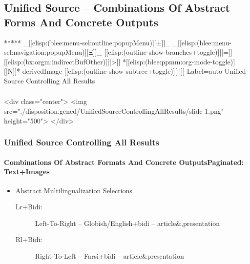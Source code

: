 \begin{whenOrg}
\section{Unified Source -- Combinations Of Abstract Forms And Concrete Outputs}

\begin{whenOrg}
*****  _[[elisp:(blee:menu-sel:outline:popupMenu)][±]]_ _[[elisp:(blee:menu-sel:navigation:popupMenu)][Ξ]]_ [[elisp:(outline-show-branches+toggle)][|=]] [[elisp:(bx:orgm:indirectBufOther)][|>]] *[[elisp:(blee:ppmm:org-mode-toggle)][|N]]*  derivedImage [[elisp:(outline-show-subtree+toggle)][||]] Label=auto Unified Source Controlling All Results
\end{whenOrg}

\begin{htmlonly}

\begin{frame}[fragile,plain,label=UnifiedSourceControllingAllResults]
    \frametitle{}
    \framesubtitle{}
    \begin{rawhtml}
<div class="center">
<img src="./disposition.gened/UnifiedSourceControllingAllResults/slide-1.png" height="500">
</div>
    \end{rawhtml}
\end{frame}
\end{htmlonly}

\begin{verblatex}

\begin{frame}[fragile,plain,label=UnifiedSourceControllingAllResults]
    \frametitle{Unified Source Controlling All Results}
    \framesubtitle{Combinations Of Abstract Formats And Concrete OutputsPaginated: Text+Images}


    \begin{itemize}
    \item Abstract Multilingualization Selections
      \begin{description}
      \item[Lr+Bidi:] Left-To-Right -- Globish/English+bidi -- article\&,presentation
      \item[Rl+Bidi:] Right-To-Left -- Farsi+bidi  -- article\&presentation
      \end{description}
    \end{itemize}


\end{frame}
\end{verblatex}
\end{whenOrg}
